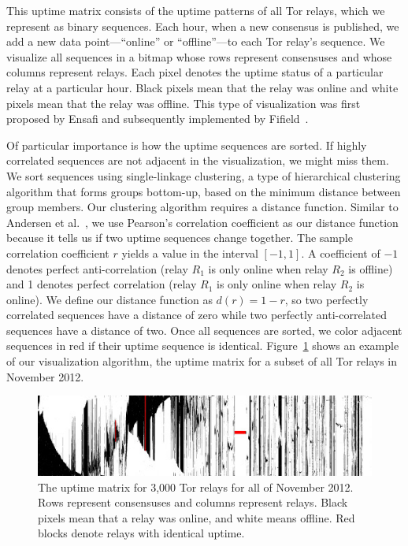 This uptime matrix consists of the uptime patterns of all Tor relays, which we
represent as binary sequences.  Each hour, when a new consensus is published, we
add a new data point---``online'' or ``offline''---to each Tor relay's sequence.
We visualize all sequences in a bitmap whose rows represent consensuses and
whose columns represent relays.  Each pixel denotes the uptime status of a
particular relay at a particular hour.  Black pixels mean that the relay was
online and white pixels mean that the relay was offline.  This type of
visualization was first proposed by Ensafi and subsequently implemented by
Fifield~\cite{Fifield2014a}.

Of particular importance is how the uptime sequences are sorted.  If highly
correlated sequences are not adjacent in the visualization, we might miss them.
We sort sequences using single-linkage clustering, a type of hierarchical
clustering algorithm that forms groups bottom-up, based on the minimum distance
between group members.  Our clustering algorithm requires a distance function.
Similar to Andersen et al.~\cite{Andersen2002a}, we use Pearson's correlation
coefficient as our distance function because it tells us if two uptime sequences
change together.  The sample correlation coefficient $r$ yields a value in the
interval $[-1, 1]$.  A coefficient of $-1$ denotes perfect anti-correlation
(relay $R_1$ is only online when relay $R_2$ is offline) and 1 denotes perfect
correlation (relay $R_1$ is only online when relay $R_2$ is online).  We define
our distance function as $d(r) = 1 - r$, so two perfectly correlated sequences
have a distance of zero while two perfectly anti-correlated sequences have a
distance of two.  Once all sequences are sorted, we color adjacent sequences in
red if their uptime sequence is identical.  Figure~\ref{fig:uptime-matrix} shows
an example of our visualization algorithm, the uptime matrix for a subset of all
Tor relays in November 2012.

\begin{figure}[t]
	\centering
	\includegraphics[width=\linewidth]{diagrams/2012-11.jpg}
	\caption{The uptime matrix for 3,000 Tor relays for all of November 2012.
	Rows represent consensuses and columns represent relays.  Black pixels mean
	that a relay was online, and white means offline.  Red blocks denote relays
	with identical uptime.}
	\label{fig:uptime-matrix}
\end{figure}

